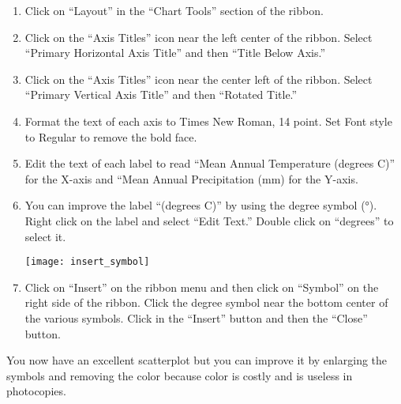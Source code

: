 \documentclass[12pt, hidelinks]{exam}
\begin{document}
\begin{enumerate}[resume]
	\item Click on “Layout” in the “Chart Tools” section of the ribbon.

	\item Click on the “Axis Titles” icon near the left center of the ribbon. Select “Primary Horizontal Axis Title” and then “Title Below Axis.” 

	\item Click on the “Axis Titles” icon near the center left of the ribbon. Select “Primary Vertical Axis Title” and then “Rotated Title.” 

	\item Format the text of each axis to Times New Roman, 14 point. Set Font style to Regular to remove the bold face.

	\item Edit the text of each label to read “Mean Annual Temperature (degrees C)” for the X-axis and “Mean Annual Precipitation (mm) for the Y-axis.

	\item You can improve the label “(degrees C)” by using the degree symbol (°). Right click on the label and select “Edit Text.” Double click on “degrees” to select it.

\begin{center}
	\texttt{[image: insert\_symbol]}
\end{center}

	\item Click on “Insert” on the ribbon menu and then click on “Symbol” on the right side of the ribbon. Click the degree symbol near the bottom center of the various symbols. Click in the “Insert” button and then the “Close” button. 
\end{enumerate}
 
You now have an excellent scatterplot but you can improve it by enlarging the symbols and removing the color because  color is costly and is useless in photocopies.
\end{document}
